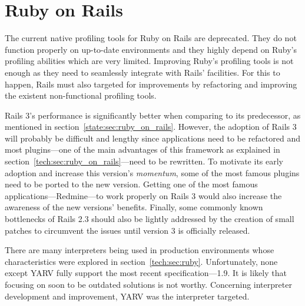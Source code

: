 \section{Ruby on Rails}
The current native profiling tools for Ruby on Rails are deprecated. They do not function properly on up-to-date environments and they highly depend on Ruby's profiling abilities which are very limited. Improving Ruby's profiling tools is not enough as they need to seamlessly integrate with Rails' facilities. For this to happen, Rails must also targeted for improvements by refactoring and improving the existent non-functional profiling tools.

Rails 3's performance is significantly better when comparing to its predecessor, as mentioned in section~\ref{state:sec:ruby_on_rails}. However, the adoption of Rails 3 will probably be difficult and lengthy since applications need to be refactored and most plugins---one of the main advantages of this framework as explained in section~\ref{tech:sec:ruby_on_rails}---need to be rewritten. To motivate its early adoption and increase this version's \textit{momentum}, some of the most famous plugins need to be ported to the new version. Getting one of the most famous applications---Redmine---to work properly on Rails 3 would also increase the awareness of the new versions' benefits. Finally, some commonly known bottlenecks of Rails 2.3 should also be lightly addressed by the creation of small patches to circumvent the issues until version 3 is officially released.


\begin{comment}
Rails scalability should be easily accessible to everyone

Improve existing tools, create/improve measurement tools

Missing performance-oriented guidelines and conventions

Missing and out-dated tools to profile Rails applications

Optimal configurations and setups
\end{comment}


There are many interpreters being used in production environments whose characteristics were explored in section~\ref{tech:sec:ruby}. Unfortunately, none except YARV fully support the most recent specification---1.9. It is likely that focusing on soon to be outdated solutions is not worthy. Concerning interpreter development and improvement, YARV was the interpreter targeted.


